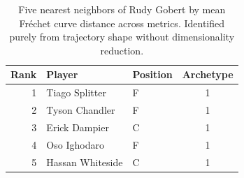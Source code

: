 \begin{table}[htbp]
  \centering\small
  \begin{tabular}{rllc}
    \toprule
    Rank & Player & Position & Archetype \\
    \midrule
    1 & Tiago Splitter & F & 1 \\
    2 & Tyson Chandler & F & 1 \\
    3 & Erick Dampier & C & 1 \\
    4 & Oso Ighodaro & F & 1 \\
    5 & Hassan Whiteside & C & 1 \\
    \bottomrule
  \end{tabular}
  \caption{Five nearest neighbors of Rudy Gobert by mean Fr\'{e}chet curve distance across metrics. Identified purely from trajectory shape without dimensionality reduction.}
  \label{tab:Rudy_Gobert_frechet_curve_neighbors}
\end{table}

